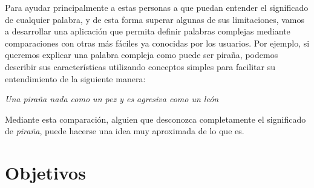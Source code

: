 Para ayudar principalmente a estas personas a que puedan entender el significado de cualquier palabra, y de esta forma superar algunas de sus limitaciones, vamos a desarrollar una aplicación que permita definir palabras complejas mediante comparaciones con otras más fáciles ya conocidas por los usuarios. Por ejemplo, si queremos explicar una palabra compleja como puede ser piraña, podemos describir sus características utilizando conceptos simples para facilitar su entendimiento de la siguiente manera:
 
\textit{Una piraña nada como un pez y es agresiva como un león}




Mediante esta comparación, alguien que desconozca completamente el significado de \textit{piraña}, puede hacerse una idea muy aproximada de lo que es.


\section{Objetivos}
\label{cap:sec:objetivos}

